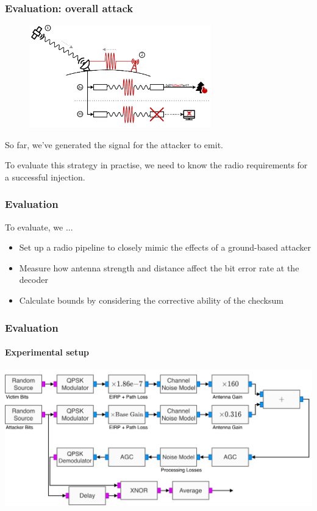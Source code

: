 \documentclass{beamer}
\begin{document}
\begin{frame}
  \frametitle{Evaluation: overall attack}
  \begin{figure}
      \centering
      \includegraphics[width=0.7\textwidth]{images/attack_illustration.pdf}
      \label{fig:attack-illustration}
  \end{figure}
  So far, we've generated the signal for the attacker to emit.

  To evaluate this strategy in practise, we need to know the radio requirements for a successful injection.
\end{frame}

\begin{frame}
  \frametitle{Evaluation}
  To evaluate, we ...
  \begin{itemize}[<+->]
    \item Set up a radio pipeline to closely mimic the effects of a ground-based attacker
    \item Measure how antenna strength and distance affect the bit error rate at the decoder
    \item Calculate bounds by considering the corrective ability of the checksum
  \end{itemize}
\end{frame}

\begin{frame}
  \frametitle{Evaluation}
  \framesubtitle{Experimental setup}
  \includegraphics[width=\textwidth]{images/overshadowing_pipeline.pdf}
\end{frame}
\end{document}
